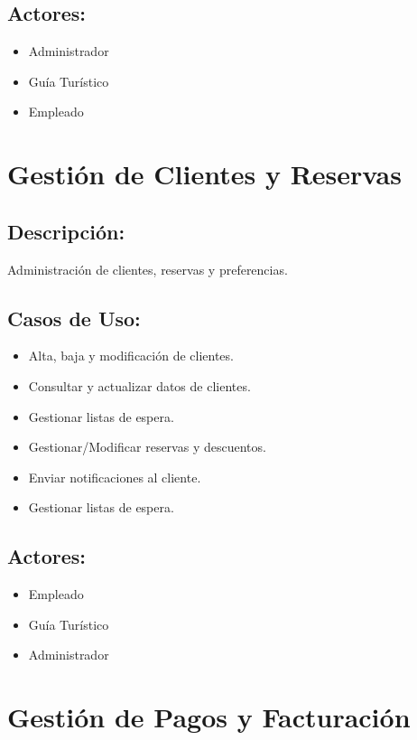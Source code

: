 \subsection*{Actores:}
\begin{itemize}
    \item Administrador
    \item Guía Tur\'istico
    \item Empleado
\end{itemize}

\section{Gesti\'on de Clientes y Reservas}

\subsection*{Descripci\'on:}
Administraci\'on de clientes, reservas y preferencias.

\subsection*{Casos de Uso:}
\begin{itemize}
    \item Alta, baja y modificaci\'on de clientes.
    \item Consultar y actualizar datos de clientes.
    \item Gestionar listas de espera.
    \item Gestionar/Modificar reservas y descuentos.
    \item Enviar notificaciones al cliente.
    \item Gestionar listas de espera.
\end{itemize}

\subsection*{Actores:}
\begin{itemize}
    \item Empleado
    \item Guía Tur\'istico
    \item Administrador 
\end{itemize}

\section{Gesti\'on de Pagos y Facturaci\'on}

